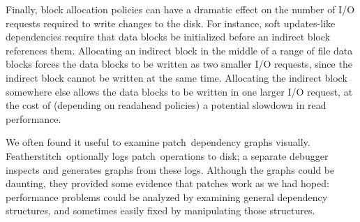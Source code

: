 \documentclass[9pt,twocolumn,letterpaper]{article}
\newcommand{\Kudos}{Featherstitch}
\newcommand{\patch}{patch}
\newcommand{\patches}{patches}
\newcommand{\modules}{modules}
\begin{document}
\begin{comment}
The buffer cache and a few other \modules\ perform better in the
common case that each block's \patches\ are listed in order of creation
time,
%
taking $O(n)$ time to process $n$ patches rather than $O(n^2)$.
\end{comment}

Finally, block allocation policies can have a dramatic effect on the number of
I/O requests required to write changes to the disk. For instance, soft
updates-like dependencies require that data blocks be initialized before
an indirect block references them.   
Allocating an
indirect block in the middle of a range of file data blocks
forces the data blocks to be
written as two smaller I/O requests, since the indirect block
cannot be written at the same time. Allocating the indirect block somewhere
else allows the data blocks to be written in one larger I/O request, at the
cost of (depending on readahead policies) a potential slowdown in read performance.



We often found it useful to examine \patch\ dependency graphs visually.
\Kudos\ optionally logs \patch\ operations to disk;
a separate debugger inspects and generates graphs from these
logs.
%
Although the graphs could be daunting, they provided some evidence that
patches work as we had hoped: performance problems could
be analyzed by examining general dependency structures, and
sometimes easily fixed by manipulating those structures.


\begin{comment}
Several functions in \Kudos\ iterate over lists of \patches\ looking for either
a single \patch\ or set of \patches\ satisfying some property, or trying to
process all the \patches\ in the list in some order determined by the dependency
graph. It is generally the case that the \patches\ satisfying the property or
the order in which the \patches\ should be processed can be determined very
quickly by keeping the lists sorted. For instance, the library function which
reverts \patches\ needs to perform the revert operations essentially in inverse
creation order, so that reverting a \patch\ which has since been overwritten
by a later \patch\ does the right thing. Keeping the list of all \patches\ on a
block sorted in creation order (which is very easy) makes this an efficient
operation, while it might otherwise take $O(n^2)$ time to execute. Similarly,
many \patch\ merging functions need to find for a given block some \patch\
which has no \befores\ on the same block, and the oldest \patch\ on a block
always satisfies this requirement.
\end{comment}
\end{document}
